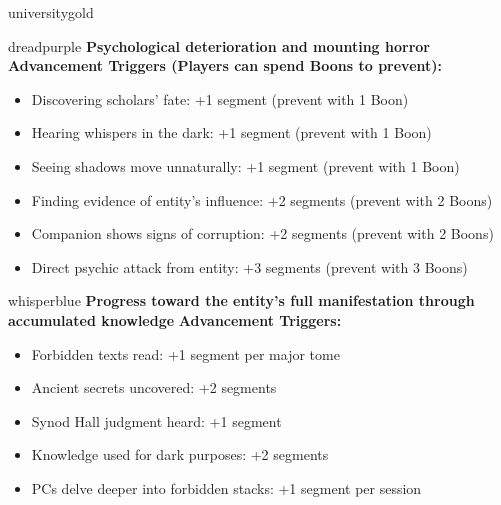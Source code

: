\documentclass[11pt]{article}
\begin{document}
\begin{campaignsection}{universitygold}
\begin{clockbox}{dreadpurple}
\textbf{Psychological deterioration and mounting horror}
\textbf{Advancement Triggers (Players can spend Boons to prevent):}
\begin{itemize}
    \item Discovering scholars' fate: +1 segment (prevent with 1 Boon)
    \item Hearing whispers in the dark: +1 segment (prevent with 1 Boon)
    \item Seeing shadows move unnaturally: +1 segment (prevent with 1 Boon)
    \item Finding evidence of entity's influence: +2 segments (prevent with 2 Boons)
    \item Companion shows signs of corruption: +2 segments (prevent with 2 Boons)
    \item Direct psychic attack from entity: +3 segments (prevent with 3 Boons)
\end{itemize}
\end{clockbox}

\begin{clockbox}{whisperblue}
\textbf{Progress toward the entity's full manifestation through accumulated knowledge}
\textbf{Advancement Triggers:}
\begin{itemize}
    \item Forbidden texts read: +1 segment per major tome
    \item Ancient secrets uncovered: +2 segments
    \item Synod Hall judgment heard: +1 segment
    \item Knowledge used for dark purposes: +2 segments
    \item PCs delve deeper into forbidden stacks: +1 segment per session
\end{itemize}
\end{clockbox}
\end{campaignsection}

\newpage
\end{document}
